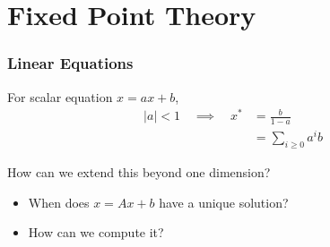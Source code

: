 





\section{Fixed Point Theory}

\begin{frame}
     \frametitle{Linear Equations}   

    For scalar equation $x = ax + b$, 
    \begin{align*}
        |a| < 1 \quad \implies \quad
        x^* & = \frac{b}{1-a} \\
            & = \sum_{i \geq 0} a^i b
    \end{align*}

    How can we extend this beyond one dimension?

    \vspace{1em}
    \begin{itemize}
        \item When does $x = Ax + b$ have a unique solution?
        \vspace{1em}
        \item How can we compute it?
    \end{itemize}

\end{frame}


